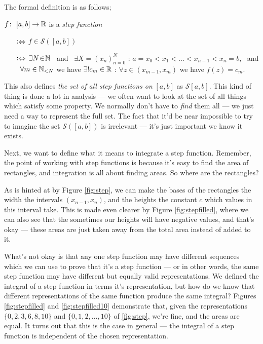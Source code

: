 The formal definition is as follows;
\begin{definition}
    $f\colon \ [a, b] \rightarrow \mathbb{R}$ is a {\em step function}
    \begin{itemize}
        \item[$\mathrel{\vcentcolon\Leftrightarrow}$]
            $f \in \mathcal{S}([a, b])$
        \item[$\mathrel{\vcentcolon\Leftrightarrow}$]
            $\exists N \! \in \! \mathbb{N}$ \ and \ $\exists X = (x_n)_{n=0}^N$ : $a = x_0 < x_1 < \ldots < x_{n-1} < x_n = b$, \ and \ $\forall m\in\mathbb{N}_{< N}$ we have $\exists! c_m \in \mathbb{R}$ : $\forall z \in (x_{m-1}, x_{m})$ we have $f(z) = c_m$.
    \end{itemize}
\end{definition}

This also defines \emph{the set of all step functions on} $[a, b]$ as $\mathcal{S}[a, b]$. This kind of thing is done a lot in analysis --- we often want to look at the set of all things which satisfy some property. We normally don't have to \emph{find} them all --- we just need a way to represent the full set. The fact that it'd be near impossible to try to imagine the set $\mathcal{S}([a, b])$ is irrelevant --- it's just important we know it exists.

Next, we want to define what it means to integrate a step function. Remember, the point of working with step functions is because it's easy to find the area of rectangles, and integration is all about finding areas. So where are the rectangles? 

As is hinted at by Figure \ref{fig:step}, we can make the bases of the rectangles the width the intervals $(x_{n-1}, x_n)$, and the heights the constant $c$ which values in this interval take. This is made even clearer by Figure \ref{fig:stepfilled}, where we can also see that the sometimes our heights will have negative values, and that's okay --- these areas are just taken away from the total area instead of added to it.
 
What's not okay is that any one step function may have different sequences which we can use to prove that it's a step function --- or in other words, the same step function may have different but equally valid representations. We defined the integral of a step function in terms it's representation, but how do we know that different representations of the same function produce the same integral? Figures \ref{fig:stepfilled} and \ref{fig:stepfilled10} demonstrate that, given the representations $\{0, 2, 3, 6, 8, 10\}$ and $\{0, 1, 2, \ldots, 10\}$ of \ref{fig:step}, we're fine, and the areas are equal. It turns out that this is the case in general --- the integral of a step function is independent of the chosen representation.

